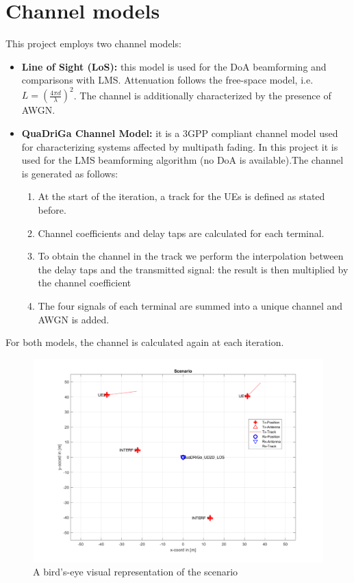 \documentclass[a4paper,10pt]{article}
\begin{document}
\section{Channel models}
This project employs two channel models:
\begin{itemize}
	\item \textbf{Line of Sight (LoS):} this model is used for the DoA beamforming and comparisons with LMS. Attenuation follows the free-space model, i.e. $ \displaystyle L= \left( \frac{4\pi d}{\lambda} \right)^2$. The channel is additionally characterized by the presence of AWGN.
	\item \textbf{QuaDriGa Channel Model:} it is a 3GPP compliant channel model used for characterizing systems affected by multipath fading. In this project it is used for the LMS beamforming algorithm (no DoA is available).The channel is generated as follows:
	\begin{enumerate}
		\item At the start of the iteration, a track for the UEs is defined as stated before.
		\item Channel coefficients and delay taps are calculated for each terminal.
		\item To obtain the channel in the track we perform the interpolation between the delay taps and the transmitted signal: the result is then multiplied by the channel coefficient
		\item The four signals of each terminal are summed into a unique channel and AWGN is added.
		
	\end{enumerate}
\end{itemize}

For both models, the channel is calculated again at each iteration.
\begin{figure}
	\centering
	\includegraphics[width=0.8\linewidth]{scenario.pdf}
	\caption{\label{fig:scenario}A bird's-eye visual representation of the scenario}
\end{figure}
\end{document}
